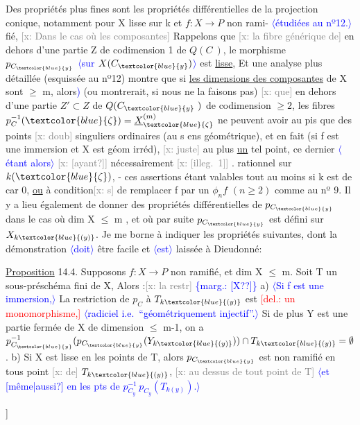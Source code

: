 \documentclass[11pt]{article}
\newcommand{\scanpage}[1]{\par\bigskip\noindent{\small\sffamily[scan #1]}\par}
\newcommand{\mspage}[1]{{\small\sffamily[p.\,#1]}}
\newcommand{\hand}[1]{\textcolor{blue}{#1}}
\newcommand{\inserted}[2][]{\textcolor{blue}{$\langle$#2$\rangle$}}
\newcommand{\margin}[1]{\textcolor{blue}{\{\textsf{marg.:} #1\}}}
\newcommand{\deleted}[1]{\textcolor{red}{[\textsf{del.:} #1]}}
\newcommand{\xout}[1]{\textcolor{gray}{[\textsf{x:} #1]}}
\newcommand{\uline}[1]{\underline{#1}}
\newcommand{\unsure}[1]{[#1?]}
\newcommand{\illegible}[1]{[\textsf{illeg.\ #1}]}
\begin{document}
Des propriétés plus fines sont les propriétés différentielles de
la projection conique, notamment pour X lisse sur k et $f:X\longrightarrow P$ non rami-%
\inserted[typed]{étudiées au nº12.}
fié, \xout{Dans le cas où les composantes} Rappelons que \xout{la fibre générique de}
en dehors d'une partie Z de codimension 1 de $Q(C\ )$, le morphisme
$p_{C_{\hand{y}}}$ \inserted[typed]{sur $X(C_{\hand{y}})$} est \uline{lisse}, Et une analyse plus détaillée (esquissée au nº12) montre
que si \uline{les dimensions des composantes} de X sont $\geq$ m, alors\hand{)}
(ou montrerait, si nous ne la faisons pas) \xout{que} en dehors d'une partie $Z'\subset Z$
de $Q(C_{\hand{y}}\ )$ de codimension $\geq 2$, les fibres $p_C^{-1}(\hand{\zeta}) = \underline{X}^{(m)}_{\hand{\zeta}}$ ne peuvent
avoir au pis que des points \xout{doub} singuliers ordinaires (au s ens
géométrique), et en fait (si f est une immersion et X est géom irréd),
\xout{juste} au plus \uline{un} tel point, ce dernier \inserted[typed]{étant alors} \xout{\unsure{ayant}} nécessairement \xout{\illegible{1}} .
rationnel sur $k(\hand{\zeta})$, - ces assertions étant valables tout au moins si
k est de car 0, \uline{ou} à condition\xout{s} de remplacer f par un $\phi_n f$ $(n\geq 2)$ comme
au nº 9. Il y a lieu également de donner des propriétés différentielles
de $p_{C_{\hand{y}}}$ dans le cas où dim X $\leqslant$ m , et où par suite $p_{C_{\hand{y}}}$ est défini sur $X_{k\hand{(y)}}$.
Je me borne à indiquer les propriétés suivantes, dont la démonstration
\inserted{doit} être facile et \inserted{est} laissée à Dieudonné:

\uline{Proposition} 14.4. Supposons $f:X\longrightarrow P$ non ramifié, et dim X $\leqslant$ m.
Soit T un sous-préschéma fini de X, Alors :\xout{la restr}
\margin{\unsure{X?}} a) \inserted{Si f est une immersion,} La restriction de $p_C$ à $T_{k\hand{(y)}}$ est \deleted{un monomorphisme,} \inserted{radiciel i.e.\ ``géométriquement injectif''.} Si de
plus Y est une partie fermée de X de dimension $\leqslant$ m-1, on a
$p_{C_{\hand{y}}}^{-1}(p_{C_{\hand{y}}}(Y_{k\hand{(y)}})) \cap T_{k\hand{(y)}} = \emptyset$ .
b) Si X est lisse en les points de T, alors $p_{C_{\hand{y}}}$ est non ramifié
en tous point \xout{de} $T_{k\hand{(y)}}$, \xout{au dessus de tout point de T} \inserted{et \unsure{même|aussi} en les pts de $p_{C_y}^{-1}\,p_{C_y}(T_{k(y)})$.}
\mspage{\hand{83}}

\clearpage
\scanpage{25/90}
\mspage{\unsure{87}}
\end{document}

